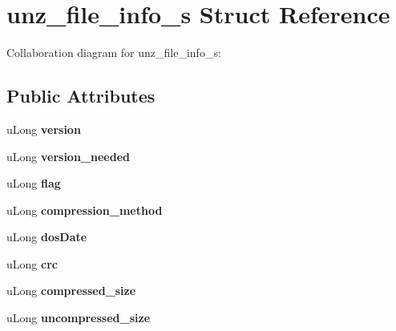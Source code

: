 \hypertarget{structunz__file__info__s}{\section{unz\+\_\+file\+\_\+info\+\_\+s Struct Reference}
\label{structunz__file__info__s}
}


Collaboration diagram for unz\+\_\+file\+\_\+info\+\_\+s\+:
\subsection*{Public Attributes}
\begin{DoxyCompactItemize}
\item 
\hypertarget{structunz__file__info__s_a635f933b26b636d8314cef61af62fcef}{u\+Long {\bfseries version}}\label{structunz__file__info__s_a635f933b26b636d8314cef61af62fcef}

\item 
\hypertarget{structunz__file__info__s_a1578aca2bb7fed658f9f94c78d00288e}{u\+Long {\bfseries version\+\_\+needed}}\label{structunz__file__info__s_a1578aca2bb7fed658f9f94c78d00288e}

\item 
\hypertarget{structunz__file__info__s_adff7171a3114d55e5532c593b1779ecc}{u\+Long {\bfseries flag}}\label{structunz__file__info__s_adff7171a3114d55e5532c593b1779ecc}

\item 
\hypertarget{structunz__file__info__s_aaaca88f0ebec5c1cfebb436b8e70a774}{u\+Long {\bfseries compression\+\_\+method}}\label{structunz__file__info__s_aaaca88f0ebec5c1cfebb436b8e70a774}

\item 
\hypertarget{structunz__file__info__s_a14bd7da84cada0f4b1455d60274eef91}{u\+Long {\bfseries dos\+Date}}\label{structunz__file__info__s_a14bd7da84cada0f4b1455d60274eef91}

\item 
\hypertarget{structunz__file__info__s_a6d741cb2df07794d7a4794841148893b}{u\+Long {\bfseries crc}}\label{structunz__file__info__s_a6d741cb2df07794d7a4794841148893b}

\item 
\hypertarget{structunz__file__info__s_a35ee9d733879c87565e40a545fe46fb6}{u\+Long {\bfseries compressed\+\_\+size}}\label{structunz__file__info__s_a35ee9d733879c87565e40a545fe46fb6}

\item 
\hypertarget{structunz__file__info__s_a7696a98511bc57e389485e5313a9c2bf}{u\+Long {\bfseries uncompressed\+\_\+size}}\label{structunz__file__info__s_a7696a98511bc57e389485e5313a9c2bf}


\end{DoxyCompactItemize}
